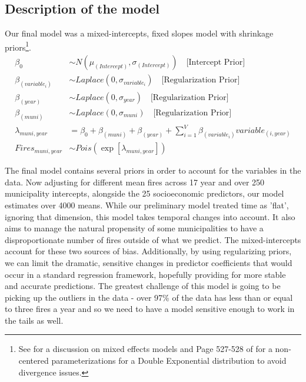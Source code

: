\documentclass[10pt,a4paper, hidelinks]{article} %
\begin{document}
\subsection{Description of the model}

\newcommand{\munis}{\ensuremath{muni}\xspace}
\newcommand{\years}{\ensuremath{year}\xspace}
\newcommand{\vars}[1]{\ensuremath{variable_{#1}}\xspace}
\newcommand{\indic}[2]{\ensuremath{\mathbb{I}\left[#1 = #2\right]}\xspace}

Our final model was a mixed-intercepts, fixed slopes model with shrinkage priors\footnote{See \cite{stantutorial} for a discussion on mixed effects models and Page 527-528 of \cite{stanmanual} for a non-centered parameterizations for a Double Exponential distribution to avoid divergence issues. }. 
%
\begin{align*}
	\beta_0 &\sim N(\mu_{(Intercept)},\sigma_{(Intercept)}) \quad \text{[Intercept Prior]}\\
	\beta_{(\vars{i})} &\sim Laplace(0, \sigma_{\vars{i}}) \quad \text{[Regularization Prior]}\\
	\beta_{(\years)} &\sim Laplace(0, \sigma_{\years}) \quad \text{[Regularization  Prior]}\\
	\beta_{(\munis)} &\sim Laplace(0, \sigma_{\munis}) \quad \text{[Regularization Prior]}\\
	\lambda_{\munis, \years} &= \beta_0 + \beta_{(\munis)} + \beta_{(\years)} + \sum\nolimits_{i = 1}^{V} \beta_{(\vars{i})} \vars{(i, \years)}\\
	Fires_{\munis, \years} &\sim Pois\left(\exp\left[\lambda_{\munis, \years}\right]\right)
\end{align*}

The final model contains several priors in order to account for the variables in the data.  Now adjusting for different mean fires across 17 year and over 250 municipality intercepts, alongside the 25 socioeconomic predictors, our model estimates over 4000 means.  While our preliminary model treated time as 'flat', ignoring that dimension, this model takes temporal changes into account. It also aims to manage the natural propensity of some municipalities to have a disproportionate number of fires outside of what we predict. The mixed-intercepts account for these two sources of bias. Additionally, by using regularizing priors, we can limit the dramatic, sensitive changes in predictor coefficients that would occur in a standard regression framework, hopefully providing for more stable and accurate predictions. The greatest challenge of this model is going to be picking up the outliers in the data - over 97\% of the data has less than or equal to three fires a year and so we need to have a model sensitive enough to work in the tails as well.
\end{document}
